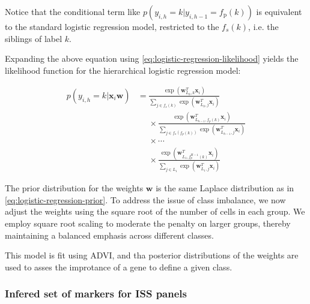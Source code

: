 Notice that the conditional term like $p(y_{i,h} = k | y_{i,h-1} = f_{\text{p}}(k))$ is equivalent to the standard logistic regression model, restricted to the $f_s(k)$, i.e. the siblings of label $k$. 

Expanding the above equation using \cref{eq:logistic-regression-likelihood} yields the likelihood function for the hierarchical logistic regression model:

\begin{equation}
    \begin{aligned}
    p(y_{i,h} = k | \mathbf{x}_{i} \mathbf{w}) &= 
         \frac{\exp(\mathbf{w}_{L_h, k}^T \mathbf{x}_i)}{\sum_{j \in f_s(k)} \exp(\mathbf{w}_{L_h, j}^T \mathbf{x}_i)} \\
        &\phantom{=} \times \frac{\exp(\mathbf{w}_{L_{h-1}, f_p(k)}^T \mathbf{x}_i)}{\sum_{j \in  f_s(f_p(k))} \exp(\mathbf{w}_{L_{h-1}, j}^T \mathbf{x}_i)} \\
        &\phantom{=} \times \cdots \\
        &\phantom{=} \times \frac{\exp(\mathbf{w}_{L_1, f_p^{H-1}(k)}^T \mathbf{x}_i)}{\sum_{j \in L_1} \exp(\mathbf{w}_{L_1, j}^T \mathbf{x}_i)}
    \end{aligned}
\end{equation}

The prior distribution for the weights $\mathbf{w}$ is the same Laplace distribution as in \cref{eq:logistic-regression-prior}. To address the issue of class imbalance, we now adjust the weights using the square root of the number of cells in each group. We employ square root scaling to moderate the penalty on larger groups, thereby maintaining a balanced emphasis across different classes.

This model is fit using \ac{ADVI}, and tha posterior distributions of the weights are used to asses the improtance of a gene to define a given class. 


\subsubsection*{Infered set of markers for \ac{ISS} panels}

